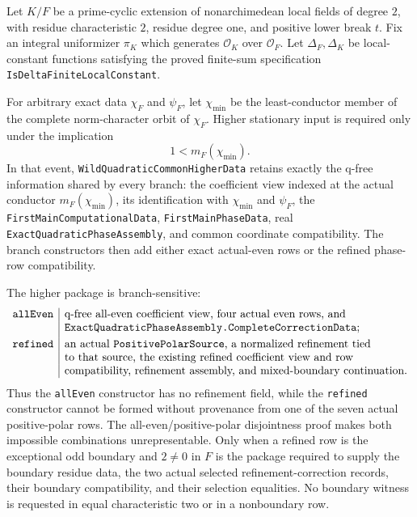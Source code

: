 \begin{theorem}\label{mod:cases-wildquadratic-main}
Let \(K/F\) be a prime-cyclic extension of nonarchimedean local fields of
degree \(2\), with residue characteristic \(2\), residue degree one, and
positive lower break \(t\).  Fix an integral uniformizer \(\pi_K\) which
generates \(\mathcal O_K\) over \(\mathcal O_F\).  Let
\(\Delta_F,\Delta_K\) be local-constant functions satisfying the proved
finite-sum specification \texttt{IsDeltaFiniteLocalConstant}.

For arbitrary exact data \(\chi_F\) and \(\psi_F\), let
\(\chi_{\min}\) be the least-conductor member of the complete
norm-character orbit of \(\chi_F\).  Higher stationary input is required
only under the implication
\[
  1<m_F(\chi_{\min}).
\]
In that event, \texttt{WildQuadraticCommonHigherData} retains exactly the
q-free information shared by every branch: the coefficient view indexed at
the actual conductor \(m_F(\chi_{\min})\), its identification with
\(\chi_{\min}\) and \(\psi_F\), the
\texttt{FirstMainComputationalData}, \texttt{FirstMainPhaseData}, real
\texttt{ExactQuadraticPhaseAssembly}, and common coordinate compatibility.
The branch constructors then add either exact actual-even rows or the
refined phase-row compatibility.

The higher package is branch-sensitive:
\[
\begin{array}{c|l}
\texttt{allEven}&
 \text{q-free all-even coefficient view, four actual even rows, and}
 \\
 &\texttt{ExactQuadraticPhaseAssembly.CompleteCorrectionData};\\[1mm]
\texttt{refined}&
 \text{an actual \texttt{PositivePolarSource}, a normalized refinement tied}
 \\
 &\text{to that source, the existing refined coefficient view and row}
 \\
 &\text{compatibility, refinement assembly, and mixed-boundary continuation.}
\end{array}
\]
Thus the \texttt{allEven} constructor has no refinement field, while the
\texttt{refined} constructor cannot be formed without provenance from one
of the seven actual positive-polar rows.  The all-even/positive-polar
disjointness proof makes both impossible combinations unrepresentable.
Only when a refined row is the exceptional odd boundary and \(2\ne0\) in
\(F\) is the package required to supply the boundary residue data, the two
actual selected refinement-correction records, their boundary compatibility,
and their selection equalities.  No boundary witness is requested in equal
characteristic two or in a nonboundary row.


\end{theorem}
